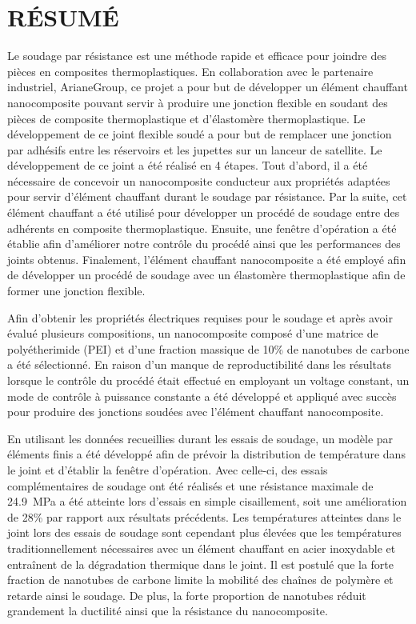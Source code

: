 %
\chapter*{RÉSUMÉ}\thispagestyle{headings}

Le soudage par résistance est une méthode rapide et efficace pour joindre des pièces en composites thermoplastiques. 
En collaboration avec le partenaire industriel, ArianeGroup, ce projet a pour but de développer un élément chauffant nanocomposite pouvant servir à produire une jonction flexible en soudant des pièces de composite thermoplastique et d'élastomère thermoplastique.
Le développement de ce joint flexible soudé a pour but de remplacer une jonction par adhésifs entre les réservoirs et les jupettes sur un lanceur de satellite. 
Le développement de ce joint a été réalisé en 4 étapes. 
Tout d'abord, il a été nécessaire de concevoir un nanocomposite conducteur aux propriétés adaptées pour servir d'élément chauffant durant le soudage par résistance. 
Par la suite, cet élément chauffant a été utilisé pour développer un procédé de soudage entre des adhérents en composite thermoplastique. 
Ensuite, une fenêtre d'opération a été établie afin d'améliorer notre contrôle du procédé ainsi que les performances des joints obtenus. 
Finalement, l'élément chauffant nanocomposite a été employé afin de développer un procédé de soudage avec un élastomère thermoplastique afin de former une jonction flexible. 

Afin d'obtenir les propriétés électriques requises pour le soudage et après avoir évalué plusieurs compositions, un nanocomposite composé d'une matrice de polyétherimide (PEI) et d'une fraction massique de 10\% de nanotubes de carbone a été sélectionné. 
En raison d'un manque de reproductibilité dans les résultats lorsque le contrôle du procédé était effectué en employant un voltage constant, un mode de contrôle à puissance constante a été développé et appliqué avec succès pour produire des jonctions soudées avec l'élément chauffant nanocomposite.  

En utilisant les données recueillies durant les essais de soudage, un modèle par éléments finis a été développé afin de prévoir la distribution de température dans le joint et d'établir la fenêtre d'opération. 
Avec celle-ci, des essais complémentaires de soudage ont été réalisés et une résistance maximale de \SI[locale=FR]{24.9}{\mega\pascal} a été atteinte lors d'essais en simple cisaillement, soit une amélioration de 28\% par rapport aux résultats précédents. 
Les températures atteintes dans le joint lors des essais de soudage sont cependant plus élevées que les températures traditionnellement nécessaires avec un élément chauffant en acier inoxydable et entraînent de la dégradation thermique dans le joint. 
Il est postulé que la forte fraction de nanotubes de carbone limite la mobilité des chaînes de polymère et retarde ainsi le soudage. 
De plus, la forte proportion de nanotubes réduit grandement la ductilité ainsi que la résistance du nanocomposite. 

